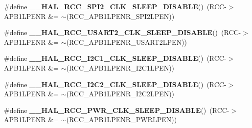 \begin{DoxyCompactItemize}
\item 
\mbox{\label{group___r_c_c___a_p_b1___low_power___enable___disable_ga4fff9b3416d2940cac20962e6d5655ec}} 
\#define {\bfseries \+\_\+\+\_\+\+H\+A\+L\+\_\+\+R\+C\+C\+\_\+\+S\+P\+I2\+\_\+\+C\+L\+K\+\_\+\+S\+L\+E\+E\+P\+\_\+\+D\+I\+S\+A\+B\+LE}()~(R\+CC-\/$>$A\+P\+B1\+L\+P\+E\+NR \&= $\sim$(R\+C\+C\+\_\+\+A\+P\+B1\+L\+P\+E\+N\+R\+\_\+\+S\+P\+I2\+L\+P\+EN))
\item 
\mbox{\label{group___r_c_c___a_p_b1___low_power___enable___disable_ga3ad038000c76cee2e7ca00d56ba64c17}} 
\#define {\bfseries \+\_\+\+\_\+\+H\+A\+L\+\_\+\+R\+C\+C\+\_\+\+U\+S\+A\+R\+T2\+\_\+\+C\+L\+K\+\_\+\+S\+L\+E\+E\+P\+\_\+\+D\+I\+S\+A\+B\+LE}()~(R\+CC-\/$>$A\+P\+B1\+L\+P\+E\+NR \&= $\sim$(R\+C\+C\+\_\+\+A\+P\+B1\+L\+P\+E\+N\+R\+\_\+\+U\+S\+A\+R\+T2\+L\+P\+EN))
\item 
\mbox{\label{group___r_c_c___a_p_b1___low_power___enable___disable_gac7dc1c5239cd70bee94eefa3d91cdd7a}} 
\#define {\bfseries \+\_\+\+\_\+\+H\+A\+L\+\_\+\+R\+C\+C\+\_\+\+I2\+C1\+\_\+\+C\+L\+K\+\_\+\+S\+L\+E\+E\+P\+\_\+\+D\+I\+S\+A\+B\+LE}()~(R\+CC-\/$>$A\+P\+B1\+L\+P\+E\+NR \&= $\sim$(R\+C\+C\+\_\+\+A\+P\+B1\+L\+P\+E\+N\+R\+\_\+\+I2\+C1\+L\+P\+EN))
\item 
\mbox{\label{group___r_c_c___a_p_b1___low_power___enable___disable_ga46fe2d4331320cfe49b751b5488fc0cd}} 
\#define {\bfseries \+\_\+\+\_\+\+H\+A\+L\+\_\+\+R\+C\+C\+\_\+\+I2\+C2\+\_\+\+C\+L\+K\+\_\+\+S\+L\+E\+E\+P\+\_\+\+D\+I\+S\+A\+B\+LE}()~(R\+CC-\/$>$A\+P\+B1\+L\+P\+E\+NR \&= $\sim$(R\+C\+C\+\_\+\+A\+P\+B1\+L\+P\+E\+N\+R\+\_\+\+I2\+C2\+L\+P\+EN))
\item 
\mbox{\label{group___r_c_c___a_p_b1___low_power___enable___disable_ga7b9889044ebfe2c9328d0f6733fda87d}} 
\#define {\bfseries \+\_\+\+\_\+\+H\+A\+L\+\_\+\+R\+C\+C\+\_\+\+P\+W\+R\+\_\+\+C\+L\+K\+\_\+\+S\+L\+E\+E\+P\+\_\+\+D\+I\+S\+A\+B\+LE}()~(R\+CC-\/$>$A\+P\+B1\+L\+P\+E\+NR \&= $\sim$(R\+C\+C\+\_\+\+A\+P\+B1\+L\+P\+E\+N\+R\+\_\+\+P\+W\+R\+L\+P\+EN))
\end{DoxyCompactItemize}


